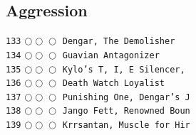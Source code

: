 \documentclass[a4paper,landscape]{article}
\begin{document}
\begin{multicols*}{5}
\section{Aggression} 
\vspace{-2mm} 
\texttt{133} \(\bigcirc\!\bigcirc\!\bigcirc\)  \texttt{Dengar, The Demolisher} \vspace{-0.3mm}\\ 
\texttt{134} \(\bigcirc\!\bigcirc\!\bigcirc\)  \texttt{Guavian Antagonizer} \vspace{-0.3mm}\\ 
\texttt{135} \(\bigcirc\!\bigcirc\!\bigcirc\)  \texttt{Kylo’s T, I, E Silencer, } \vspace{-0.3mm}\\ 
\texttt{136} \(\bigcirc\!\bigcirc\!\bigcirc\)  \texttt{Death Watch Loyalist} \vspace{-0.3mm}\\ 
\texttt{137} \(\bigcirc\!\bigcirc\!\bigcirc\)  \texttt{Punishing One, Dengar’s J} \vspace{-0.3mm}\\ 
\texttt{138} \(\bigcirc\!\bigcirc\!\bigcirc\)  \texttt{Jango Fett, Renowned Boun} \vspace{-0.3mm}\\ 
\texttt{139} \(\bigcirc\!\bigcirc\!\bigcirc\)  \texttt{Krrsantan, Muscle for Hir} \vspace{-0.3mm}\\ 

\end{multicols*}
\end{document}
